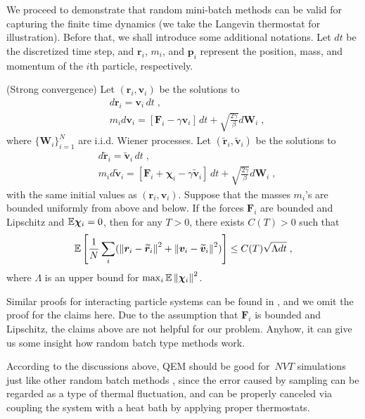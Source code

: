 We proceed to demonstrate  
that random mini-batch methods can be valid for capturing the finite time dynamics
(we take the Langevin thermostat for illustration). Before that, we shall introduce  some additional notations.
Let $d t$ be the discretized time step, and $\bm{r}_i$, $m_i$, and $\bm{p}_i$ represent the position, mass, and momentum of the $i$th particle, respectively. 
\begin{thm}(Strong convergence)
Let $(\bm{r}_i, \bm{v}_i)$ be the solutions to
\[
\begin{split}
&d\bm{r}_i=\bm{v}_i\,d t\;,\\
&m_i d\bm{v}_i=\left[\bm{F}_i-\gamma \bm{v}_i\right]\,d t+\sqrt{\frac{2\gamma}{\beta}}d \bm{W}_i\;,
\end{split}
\]
where $\{\bm{W}_i\}_{i=1}^N$ are i.i.d. Wiener processes. Let $(\widetilde{\bm{r}}_i, \widetilde{\bm{v}}_i)$ be the solutions to
\[
\begin{split}
&d \widetilde{\bm{r}}_i=\widetilde{\bm{v}}_i\,d t\;,\\
&m_i d\widetilde{\bm{v}}_i=\left[\bm{F}_i +\bm{\chi}_i-\gamma \widetilde{\bm{v}}_i\right]\,d t+\sqrt{\frac{2\gamma}{\beta}}d \bm{W}_i\;,
\end{split}
\]
with the same initial values as $(\bm{r}_i, \bm{v}_i)$. Suppose that the masses $m_i$'s are bounded uniformly from above and below.
If the forces $\bm{F}_i$ are bounded and Lipschitz and $\mathbb{E} \bm{\chi}_i=0$, then for any $T>0$, there exists $C(T)>0$ such that
\[
\mathbb{E}\left[\frac{1}{N}\sum_i (\left\lVert\bm{r}_i-\widetilde{\bm{r}}_i\right\rVert^2
+\left\lVert\bm{v}_i-\widetilde{\bm{v}}_i\right\rVert^2) \right] \leq C(T)\sqrt{\Lambda dt}\;,
\]
where $\Lambda$ is an upper bound for $\max_i  \mathbb{E}\left\lVert\bm{\chi}_i\right\rVert^2$.
\end{thm}
Similar proofs for interacting particle systems can be found in \cite{jin2020convergence,li2019stochastic,li2020random}, and we omit the proof for the claims here.  Due to the assumption that $\bm{F}_i$ is bounded and Lipschitz, the claims above are not helpful for our problem. Anyhow, it can give us some insight how random batch type methods work.

According to the discussions above, QEM should be good for~$NVT$ simulations just like other random batch methods \cite{jin2020random, jin2021random}, since the error caused by sampling can be regarded as a type of thermal fluctuation, and can be properly canceled via coupling the system with a heat bath by applying proper thermostats.

